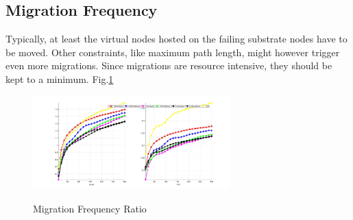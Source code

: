 \subsection{Migration Frequency}
Typically, at least the virtual nodes hosted on the failing substrate nodes have to be moved. Other constraints, like maximum path length, might however trigger even more migrations. Since migrations are resource intensive, they should be kept to a minimum.
Fig.\ref{fig:MigrationFrequence}
\begin{figure}[htbp]
  \centering
  \includegraphics[width=3in]{Fig/MigrationFrequence}\\
  \caption{Migration Frequency Ratio}\label{fig:MigrationFrequence}
\end{figure}


